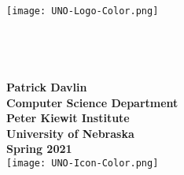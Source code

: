 \begin{center}
  \texttt{[image: UNO-Logo-Color.png]}
  \\[0.3in]
  \textbf{\courseListing{}}\\
  \courseName{}
  \\[0.75in]
  \textbf{\assignmentTitle{}}\\
  \assignmentSubtitle{}
  \\[0.75in]
  \textbf{Patrick Davlin}
  \\[0.75in]
  \textbf{Computer Science Department}\\
  \textbf{Peter Kiewit Institute}\\
  \textbf{University of Nebraska}
  \\[0.75in]
  \textbf{Spring 2021}
  \\[0.3in]
  \texttt{[image: UNO-Icon-Color.png]}
  \newpage
\end{center}